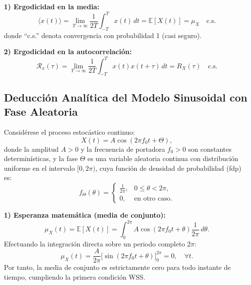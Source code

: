 \documentclass[conference]{IEEEtran}
\begin{document}
\textbf{1) Ergodicidad en la media:}
\begin{equation}
\langle x(t) \rangle = \lim_{T \to \infty} \frac{1}{2T} \int_{-T}^{T} x(t) \, dt = \mathbb{E}[X(t)] = \mu_X \quad \text{c.s.}
\label{eq:erg_mean}
\end{equation}
donde ``c.s.'' denota convergencia con probabilidad 1 (casi seguro).

\textbf{2) Ergodicidad en la autocorrelación:}
\begin{equation}
\mathcal{R}_x(\tau) = \lim_{T \to \infty} \frac{1}{2T} \int_{-T}^{T} x(t) x(t+\tau) \, dt = R_X(\tau) \quad \text{c.s.}
\label{eq:erg_rx}
\end{equation}

\subsection{Deducción Analítica del Modelo Sinusoidal con Fase Aleatoria}
Considérese el proceso estocástico continuo:
\begin{equation}
X(t) = A \cos(2\pi f_0 t + \Theta),
\label{eq:modelo_sin}
\end{equation}
donde la amplitud $A > 0$ y la frecuencia de portadora $f_0 > 0$ son constantes determinísticas, y la fase $\Theta$ es una variable aleatoria continua con distribución uniforme en el intervalo $[0, 2\pi)$, cuya función de densidad de probabilidad (fdp) es:
\begin{equation}
f_\Theta(\theta) = \begin{cases}
\frac{1}{2\pi}, & 0 \le \theta < 2\pi, \\
0, & \text{en otro caso.}
\end{cases}
\end{equation}

\textbf{1) Esperanza matemática (media de conjunto):}
\begin{equation}
\mu_X(t) = \mathbb{E}[X(t)] = \int_{0}^{2\pi} A \cos(2\pi f_0 t + \theta) \frac{1}{2\pi} \, d\theta.
\end{equation}
Efectuando la integración directa sobre un periodo completo $2\pi$:
\begin{equation}
\mu_X(t) = \frac{A}{2\pi} \Big[ \sin(2\pi f_0 t + \theta) \Big]_0^{2\pi} = 0, \quad \forall t.
\label{eq:mu_teorica}
\end{equation}
Por tanto, la media de conjunto es estrictamente cero para todo instante de tiempo, cumpliendo la primera condición WSS.
\end{document}
